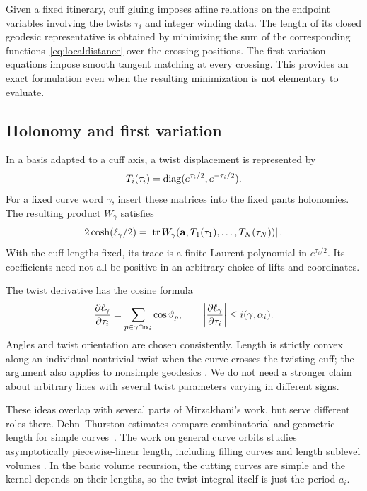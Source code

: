 Given a fixed itinerary, cuff gluing imposes affine relations on the
endpoint variables involving the twists $\tau_i$ and integer winding
data. The length of its closed geodesic representative is obtained by
minimizing the sum of the corresponding functions~\eqref{eq:localdistance}
over the crossing positions. The first-variation equations impose smooth
tangent matching at every crossing. This provides an exact formulation
even when the resulting minimization is not elementary to evaluate.

\subsection{Holonomy and first variation}

In a basis adapted to a cuff axis, a twist displacement is represented by
\[
 T_i(\tau_i)=\operatorname{diag}(e^{\tau_i/2},e^{-\tau_i/2}).
\]
For a fixed curve word $\gamma$, insert these matrices into the fixed pants
holonomies. The resulting product $W_\gamma$ satisfies
\begin{equation}
 2\cosh(\ell_\gamma/2)
  =\left|\operatorname{tr} W_\gamma(\mathbf a,T_1(\tau_1),\ldots,T_N(\tau_N))\right|.
 \label{eq:traceword}
\end{equation}
With the cuff lengths fixed, its trace is a finite Laurent polynomial in
$e^{\tau_i/2}$. Its coefficients need not all be positive in an arbitrary
choice of lifts and coordinates.

The twist derivative has the cosine formula
\begin{equation}
 \frac{\partial\ell_\gamma}{\partial\tau_i}
   =\sum_{p\in\gamma\cap\alpha_i}\cos\vartheta_p,
 \qquad
 \left|\frac{\partial\ell_\gamma}{\partial\tau_i}\right|
      \le i(\gamma,\alpha_i).
 \label{eq:cosine}
\end{equation}
Angles and twist orientation are chosen consistently. Length is strictly
convex along an individual nontrivial twist when the curve crosses the
twisting cuff; the argument also applies to nonsimple geodesics
\cite{Kerckhoff}. We do not need a stronger claim about arbitrary lines
with several twist parameters varying in different signs.

These ideas overlap with several parts of Mirzakhani's work, but serve
different roles there. Dehn--Thurston estimates compare combinatorial and
geometric length for simple curves~\cite[Section 3]{MirzSimple}. The work
on general curve orbits studies asymptotically piecewise-linear length,
including filling curves and length sublevel volumes
\cite[Sections 4 and 8]{MirzGeneral}. In the basic volume recursion, the
cutting curves are simple and the kernel depends on their lengths, so the
twist integral itself is just the period $a_i$.

